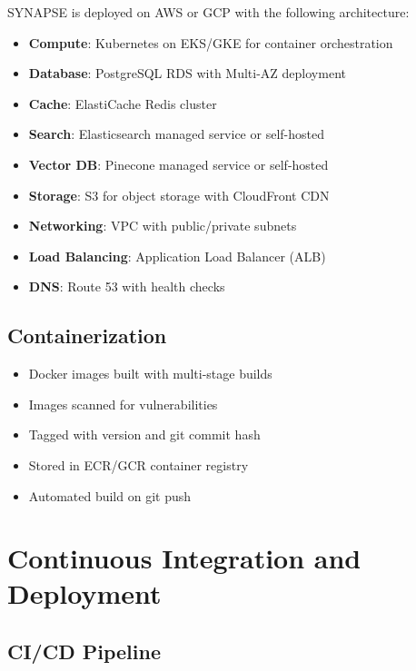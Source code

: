 \documentclass[12pt,a4paper]{report}
\begin{document}
SYNAPSE is deployed on AWS or GCP with the following architecture:

\begin{itemize}[label=\textbullet]
    \item \textbf{Compute}: Kubernetes on EKS/GKE for container orchestration
    \item \textbf{Database}: PostgreSQL RDS with Multi-AZ deployment
    \item \textbf{Cache}: ElastiCache Redis cluster
    \item \textbf{Search}: Elasticsearch managed service or self-hosted
    \item \textbf{Vector DB}: Pinecone managed service or self-hosted
    \item \textbf{Storage}: S3 for object storage with CloudFront CDN
    \item \textbf{Networking}: VPC with public/private subnets
    \item \textbf{Load Balancing}: Application Load Balancer (ALB)
    \item \textbf{DNS}: Route 53 with health checks
\end{itemize}

\subsection{Containerization}

\begin{itemize}[label=\textbullet]
    \item Docker images built with multi-stage builds
    \item Images scanned for vulnerabilities
    \item Tagged with version and git commit hash
    \item Stored in ECR/GCR container registry
    \item Automated build on git push
\end{itemize}

\section{Continuous Integration and Deployment}

\subsection{CI/CD Pipeline}
\end{document}

